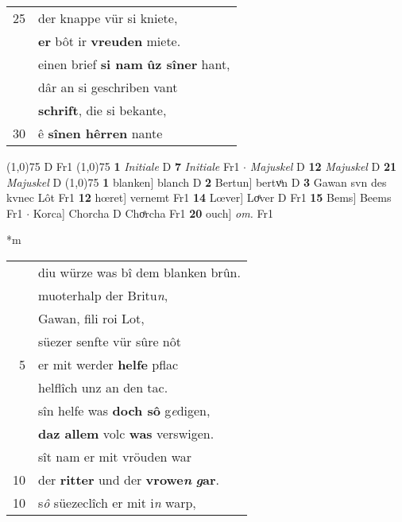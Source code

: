 \documentclass[8pt,a4paper,notitlepage]{article}
\begin{document}
\begin{table}[ht]
\begin{minipage}[t]{0.5\linewidth}
\begin{tabular}{rl}
25 & der knappe vür si kniete,\\ 
 & \textbf{er} bôt ir \textbf{vreuden} miete.\\ 
 & einen brief \textbf{si nam} \textbf{ûz sîner} hant,\\ 
 & dâr an si geschriben vant\\ 
 & \textbf{schrift}, die si bekante,\\ 
30 & ê \textbf{sînen hêrren} nante\\ 
\end{tabular}
\scriptsize
\line(1,0){75} \newline
D Fr1 \newline
\line(1,0){75} \newline
\textbf{1} \textit{Initiale} D  \textbf{7} \textit{Initiale} Fr1   $\cdot$ \textit{Majuskel} D  \textbf{12} \textit{Majuskel} D  \textbf{21} \textit{Majuskel} D  \newline
\line(1,0){75} \newline
\textbf{1} blanken] blanch D \textbf{2} Bertun] bertvͦn D \textbf{3} Gawan svn des kvnec Lôt Fr1 \textbf{12} hœret] vernemt Fr1 \textbf{14} Lœver] Loͤver D Fr1 \textbf{15} Bems] Beems Fr1  $\cdot$ Korca] Chorcha D Choͤrcha Fr1 \textbf{20} ouch] \textit{om.} Fr1 \newline
\end{minipage}
\hspace{0.5cm}
\begin{minipage}[t]{0.5\linewidth}
\small
\begin{center}*m
\end{center}
\begin{tabular}{rl}
 & diu würze was bî dem blanken brûn.\\ 
 & muoterhalp der Britu\textit{n},\\ 
 & Gawan, fili roi Lot,\\ 
 & süezer senfte vür sûre nôt\\ 
5 & er mit werder \textbf{helfe} pflac\\ 
 & helflîch unz an den tac.\\ 
 & sîn helfe was \textbf{doch sô} g\textit{e}digen,\\ 
 & \textbf{daz allem} volc \textbf{was} verswigen.\\ 
 & sît nam er mit vröuden war\\ 
10 & der \textbf{ritter} und der \textbf{vrowe\textit{n}} \textbf{\textit{g}ar}.\\ 
10 & s\textit{ô} süezeclîch er mit i\textit{n} warp,\\ 

\end{tabular}
\end{minipage}
\end{table}
\end{document}
